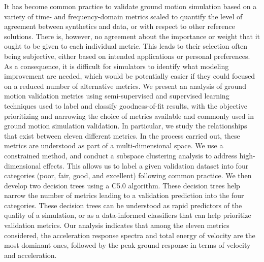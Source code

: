 % 
It has become common practice to validate ground motion simulation based on a variety of time- and frequency-domain metrics scaled to quantify the level of agreement between synthetics and data, or with respect to other reference solutions. There is, however, no agreement about the importance or weight that it ought to be given to each individual metric. This leads to their selection often being subjective, either based on intended applications or personal preferences. As a consequence, it is difficult for simulators to identify what modeling improvement are needed, which would be potentially easier if they could focused on a reduced number of alternative metrics. We present an analysis of ground motion validation metrics using semi-supervised and supervised learning techniques used to label and classify goodness-of-fit results, with the objective prioritizing and narrowing the choice of metrics available and commonly used in ground motion simulation validation. In particular, we study the relationships that exist between eleven different metrics. In the process carried out, these metrics are understood as part of a multi-dimensional space. We use a constrained \kmeans{} method, and conduct a subspace clustering analysis to address high-dimensional effects. This allows us to label a given validation dataset into four categories (poor, fair, good, and excellent) following common practice. We then develop two decision trees using a C5.0 algorithm. These decision trees help narrow the number of metrics leading to a validation prediction into the four categories. These decision trees can be understood as rapid predictors of the quality of a simulation, or as a data-informed classifiers that can help prioritize validation metrics. Our analysis indicates that among the eleven metrics considered, the acceleration response spectra and total energy of velocity are the most dominant ones, followed by the peak ground response in terms of velocity and acceleration.

